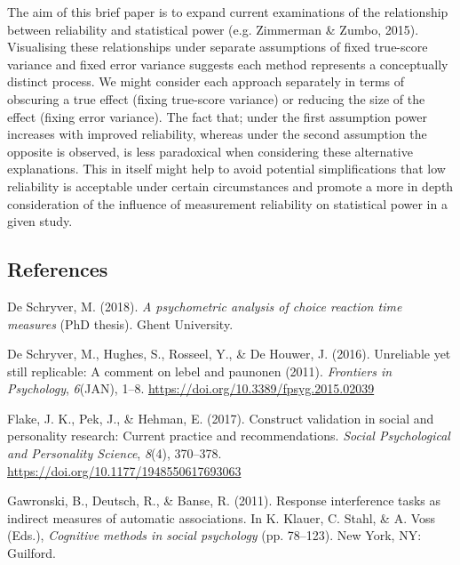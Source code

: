 \documentclass[english,,man]{apa6}
\begin{document}
The aim of this brief paper is to expand current examinations of the relationship between reliability and statistical power (e.g. Zimmerman \& Zumbo, 2015). Visualising these relationships under separate assumptions of fixed true-score variance and fixed error variance suggests each method represents a conceptually distinct process. We might consider each approach separately in terms of obscuring a true effect (fixing true-score variance) or reducing the size of the effect (fixing error variance). The fact that; under the first assumption power increases with improved reliability, whereas under the second assumption the opposite is observed, is less paradoxical when considering these alternative explanations. This in itself might help to avoid potential simplifications that low reliability is acceptable under certain circumstances and promote a more in depth consideration of the influence of measurement reliability on statistical power in a given study.

\pagebreak

\hypertarget{references}{%
\subsection{References}\label{references}}

\setlength{\parindent}{-0.4in}
\setlength{\leftskip}{0.4in}
\setlength{\parskip}{8pt}

\noindent

\hypertarget{refs}{}
\leavevmode\hypertarget{ref-DeSchryver2018}{}%
De Schryver, M. (2018). \emph{A psychometric analysis of choice reaction time measures} (PhD thesis). Ghent University.

\leavevmode\hypertarget{ref-DeSchryver2016}{}%
De Schryver, M., Hughes, S., Rosseel, Y., \& De Houwer, J. (2016). Unreliable yet still replicable: A comment on lebel and paunonen (2011). \emph{Frontiers in Psychology}, \emph{6}(JAN), 1--8. \url{https://doi.org/10.3389/fpsyg.2015.02039}

\leavevmode\hypertarget{ref-flake_construct_2017}{}%
Flake, J. K., Pek, J., \& Hehman, E. (2017). Construct validation in social and personality research: Current practice and recommendations. \emph{Social Psychological and Personality Science}, \emph{8}(4), 370--378. \url{https://doi.org/10.1177/1948550617693063}

\leavevmode\hypertarget{ref-Gawronski2011}{}%
Gawronski, B., Deutsch, R., \& Banse, R. (2011). Response interference tasks as indirect measures of automatic associations. In K. Klauer, C. Stahl, \& A. Voss (Eds.), \emph{Cognitive methods in social psychology} (pp. 78--123). New York, NY: Guilford.
\end{document}
